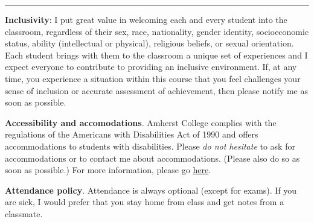 \documentclass[12pt]{article}
\begin{document}
\smallskip \hrule \medskip

\noindent\textbf{Inclusivity}: I put great value in welcoming each and every student into the classroom, regardless of their
sex, race, nationality, gender identity, socioeconomic status, ability (intellectual or physical), religious beliefs, or sexual orientation. Each student brings with them to the classroom a unique set of experiences and I expect everyone to contribute to providing an inclusive environment. If, at any time, you experience a situation within this course that you feel challenges your sense of inclusion or accurate assessment of achievement, then please notify me as soon as possible.

\bigskip

\noindent\textbf{Accessibility and accomodations}.
Amherst College complies with the regulations of the Americans with Disabilities Act of 1990 and offers accommodations to students with disabilities. Please \emph{do not hesitate} to ask for accommodations or to contact me about accommodations. (Please also do so as soon as possible.) For more information, please go \href{https://www.amherst.edu/offices/student-affairs/accessibility-services}{here}.

\bigskip
\noindent \textbf{Attendance policy}. Attendance is always optional (except for exams).
If you are sick, I would prefer that you stay home from class and get notes from a classmate.
\end{document}
